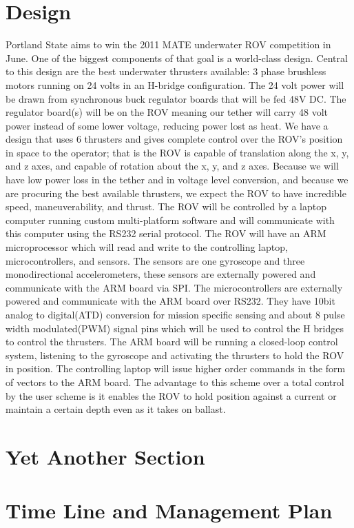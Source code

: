 \documentclass{proposalnsf}
\begin{document}
\section{Design}
Portland State aims to win the 2011 MATE underwater ROV competition in June. One of the biggest components of that goal is a world-class design. Central 
to this design are the best underwater thrusters available: 3 phase brushless motors running on 24 volts in an H-bridge configuration. The 24 volt power 
will be drawn from synchronous buck regulator boards that will be fed 48V DC. The regulator board(s) will be on the ROV meaning our tether will carry 48 
volt power instead of some lower voltage, reducing power lost as heat. We have a design that uses 6 thrusters and gives complete control over the ROV’s 
position in space to the operator; that is the ROV is capable of translation along the x, y, and z axes, and capable of rotation about the x, y, and z axes. 
Because we will have low power loss in the tether and in voltage level conversion, and because we are procuring the best available thrusters, we expect the 
ROV to have incredible speed, maneuverability, and thrust. The ROV will be controlled by a laptop computer running custom multi-platform software and will 
communicate with this computer using the RS232 serial protocol. The ROV will have an ARM microprocessor which will read and write to the controlling laptop, 
microcontrollers, and sensors. The sensors are one gyroscope and three monodirectional accelerometers, these sensors are externally powered and communicate 
with the ARM board via SPI. The microcontrollers are externally powered and communicate with the ARM board over RS232. They have 10bit analog to digital(ATD) 
conversion for mission specific sensing and about 8 pulse width modulated(PWM) signal pins which will be used to control the H bridges to control the thrusters. 
The ARM board will be running a closed-loop control system, listening to the gyroscope and activating the thrusters to hold the ROV in position. The 
controlling laptop will issue higher order commands in the form of vectors to the ARM board. The advantage to this scheme over a total control by the user 
scheme is it enables the ROV to hold position against a current or maintain a certain depth even as it takes on ballast.
\section{Yet Another Section}

\section{Time Line and Management Plan}
\end{document}
